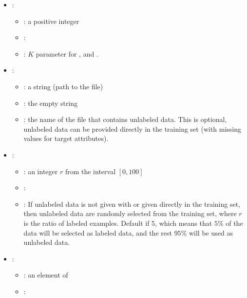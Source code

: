 \begin{itemize}
\begin{itemize}
           \end{itemize}
    \item {}:
           \begin{itemize}
                \item \optionPossibleValues{}: a positive integer
                \item \optionDefaultValue{}: 
                \item \optionDescrption{}: $K$ parameter for ,  and .
           \end{itemize}
    \item {}:
           \begin{itemize}
                \item \optionPossibleValues{}: a string (path to the file)
                \item \optionDefaultValue{}: the empty string
                \item \optionDescrption{}: the name of the file that contains unlabeled data. This is optional, unlabeled data can be provided directly in the training set (with missing values for target attributes).
           \end{itemize}
    \item {}:
           \begin{itemize}
                \item \optionPossibleValues{}: an integer $r$ from the interval $[0, 100]$
                \item \optionDefaultValue{}: 
                \item \optionDescrption{}: If unlabeled data is not given with  or given directly in the training set, then unlabeled data are randomly selected from the training set, where $r$ is the ratio of labeled examples. Default if 5, which means that $5\%$ of the data will be selected as labeled data, and the rest $95\%$ will be used as unlabeled data.
           \end{itemize}
    \item {}:
           \begin{itemize}
                \item \optionPossibleValues{}: an element of 
                \item \optionDefaultValue{}: 

\end{itemize}
\end{itemize}
